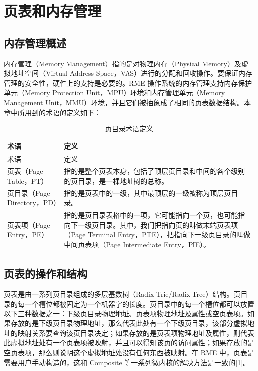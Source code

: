 \chapter{页表和内存管理}\label{ch:page-tables-and-memory-management}

\section{内存管理概述}\label{sec:3-memory-management-overview}

内存管理（Memory Management）指的是对物理内存（Physical
Memory）及虚拟地址空间（Virtual Address
Space，VAS）进行的分配和回收操作。要保证内存管理的安全性，硬件上的支持是必要的。RME 操作系统的内存管理支持内存保护单元（Memory
Protection Unit，MPU）环境和内存管理单元（Memory Management
Unit，MMU）环境，并且它们被抽象成了相同的页表数据结构。本章中所用到的术语的定义如下：

\begin{xltabular}{\textwidth}{@{}>{\hsize\raggedright\arraybackslash}X>{\hsize\raggedright\arraybackslash}X@{}}
\caption{页目录术语定义}\label{tab:3-1-page-directory-terminology}\\
\toprule
术语 & 定义\tabularnewline
\endfirsthead
\toprule
术语 & 定义\tabularnewline
\midrule
\endhead
\bottomrule
\endlastfoot
页表（Page Table，PT） &
指的是整个页表本身，包括了顶层页目录和中间的各个级别的页目录，是一棵地址树的总称。\tabularnewline
页目录（Page Directory，PD） &
指的是页表中的一级，其中最顶层的一级被称为顶层页目录。\tabularnewline
页表项（Page Entry，PE） &
指的是页目录表格中的一项，它可能指向一个页，也可能指向下一级页目录。其中，我们把指向页的叫做末端页表项（Page
Terminal Entry，PTE），把指向下一级页目录的叫做中间页表项（Page
Intermediate Entry，PIE）。\tabularnewline
\end{xltabular}

\section{页表的操作和结构}\label{sec:3-page-table-operations-and-structure}

页表是由一系列页目录组成的多层基数树（Radix Trie/Radix
Tree）结构。页目录的每一个槽位都被固定为一个机器字的长度。页目录中的每一个槽位都可以放置以下三种数据之一：下级页目录物理地址、页表项物理地址及属性或空页表项。如果存放的是下级页目录物理地址，那么代表此处有一个下级页目录，该部分虚拟地址的映射关系要查询该页目录决定；如果存放的是页表项物理地址及属性，则代表此虚拟地址处有一个页表项被映射，并且可以得知该页的访问属性；如果存放的是空页表项，那么则说明这个虚拟地址处没有任何东西被映射。在 RME 中，页表是需要用户手动构造的，这和 Composite 等一系列微内核的解决方法是一致的\hyperref[cite:3-1]{{[}1{]}}。

